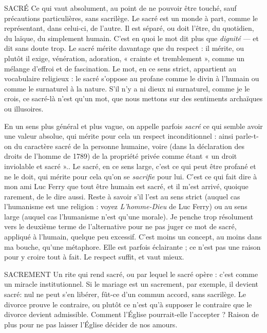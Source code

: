 
SACRÉ Ce qui vaut absolument, au point de ne pouvoir être touché, sauf
précautions particulières, sans sacrilège. Le sacré est un monde à
part, comme le représentant, dans celui-ci, de l’autre. Il est séparé, ou doit
l'être, du quotidien, du laïque, du simplement humain. C’est en quoi le mot
dit plus que {\it dignité} — et dit sans doute trop. Le sacré mérite davantage que du
respect : il mérite, ou plutôt il exige, vénération, adoration, « crainte et
tremblement », comme un mélange d’effroi et de fascination. Le mot, en ce
sens strict, appartient au vocabulaire religieux : le sacré s'oppose au profane
comme le divin à l’humain ou comme le surnaturel à la nature. S'il n’y a ni
dieux ni surnaturel, comme je le crois, ce sacré-là n’est qu’un mot, que nous
mettons sur des sentiments archaïques ou illusoires.

En un sens plus général et plus vague, on appelle parfois {\it sacré} ce qui
semble avoir une valeur absolue, qui mérite pour cela un respect
inconditionnel : ainsi parle-t-on du caractère sacré de la personne humaine,
voire (dans la déclaration des droits de l’homme de 1789) de la propriété
privée comme étant « un droit inviolable et sacré ».. Le sacré, en ce sens
large, c’est ce qui peut être profané et ne le doit, qui mérite pour cela qu’on
se {\it sacrifie} pour lui. C’est ce qui fait dire à mon ami Luc Ferry que tout être
humain est sacré, et il m'est arrivé, quoique rarement, de le dire aussi. Reste
à savoir s’il l’est au sens strict (auquel cas l’humanisme est une religion :
voyez {\it L'homme-Dieu} de Luc Ferry) ou au sens large (auquel cas l’humanisme
n'est qu’une morale). Je penche trop résolument vers le deuxième terme de
l'alternative pour ne pas juger ce mot de sacré, appliqué à l'humain, quelque
peu excessif. C’est moins un concept, au moins dans ma bouche, qu’une
métaphore. Elle est parfois éclairante ; ce n’est pas une raison pour y croire
tout à fait. Le respect suffit, et vaut mieux.

SACREMENT Un rite qui rend sacré, ou par lequel le sacré opère : c’est
comme un miracle institutionnel. Si le mariage est un sacrement,
par exemple, il devient sacré: nul ne peut s’en libérer, fût-ce d’un
commun accord, sans sacrilège. Le divorce prouve le contraire, ou plutôt ce
n’est qu’à supposer le contraire que le divorce devient admissible. Comment
l'Église pourrait-elle l’accepter ? Raison de plus pour ne pas laisser l'Église
décider de nos amours.

